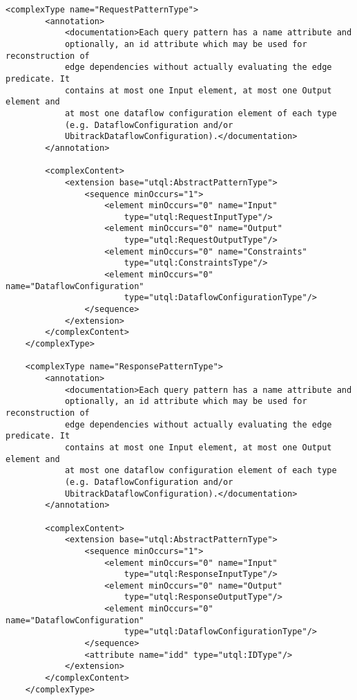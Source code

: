 \documentclass[11pt]{article}
\begin{document}
\begin{Verbatim}[fontsize=\footnotesize,tabsize=2]
    <complexType name="RequestPatternType">
        <annotation>
            <documentation>Each query pattern has a name attribute and
            optionally, an id attribute which may be used for reconstruction of
            edge dependencies without actually evaluating the edge predicate. It
            contains at most one Input element, at most one Output element and
            at most one dataflow configuration element of each type
            (e.g. DataflowConfiguration and/or
            UbitrackDataflowConfiguration).</documentation>
        </annotation>
        
        <complexContent>
            <extension base="utql:AbstractPatternType">
                <sequence minOccurs="1">
                    <element minOccurs="0" name="Input"
                        type="utql:RequestInputType"/>
                    <element minOccurs="0" name="Output"
						type="utql:RequestOutputType"/>
                    <element minOccurs="0" name="Constraints"
						type="utql:ConstraintsType"/>
                    <element minOccurs="0" name="DataflowConfiguration"
						type="utql:DataflowConfigurationType"/>
                </sequence>
            </extension>
        </complexContent>
    </complexType>
    
    <complexType name="ResponsePatternType">
        <annotation>
            <documentation>Each query pattern has a name attribute and
            optionally, an id attribute which may be used for reconstruction of
            edge dependencies without actually evaluating the edge predicate. It
            contains at most one Input element, at most one Output element and
            at most one dataflow configuration element of each type
            (e.g. DataflowConfiguration and/or
            UbitrackDataflowConfiguration).</documentation>
        </annotation>
        
        <complexContent>
            <extension base="utql:AbstractPatternType">
                <sequence minOccurs="1">
                    <element minOccurs="0" name="Input"
						type="utql:ResponseInputType"/>
                    <element minOccurs="0" name="Output"
						type="utql:ResponseOutputType"/>
                    <element minOccurs="0" name="DataflowConfiguration"
						type="utql:DataflowConfigurationType"/>
                </sequence>
                <attribute name="idd" type="utql:IDType"/>
            </extension>
        </complexContent>
    </complexType>
    
    
    

\end{Verbatim}
\end{document}
